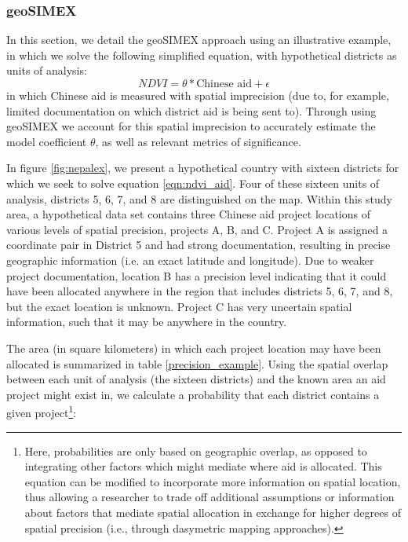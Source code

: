 \subsubsection{geoSIMEX}
In this section, we detail the geoSIMEX approach using an illustrative example, in which we solve the following simplified equation, with hypothetical districts as units of analysis:
\begin{equation}
NDVI = \theta * \text{Chinese aid} + \epsilon
\label{eqn:ndvi_aid}
\end{equation}
in which Chinese aid is measured with spatial imprecision (due to, for example, limited documentation on which district aid is being sent to). 
Through using geoSIMEX we account for this spatial imprecision to accurately estimate the model coefficient $\theta$, as well as relevant metrics of significance. 
\par
In figure \ref{fig:nepalex}, we present a hypothetical country with sixteen districts for which we seek to solve equation \ref{eqn:ndvi_aid}. 
Four of these sixteen units of analysis, districts 5, 6, 7, and 8 are distinguished on the map. 
Within this study area, a hypothetical data set contains three Chinese aid project locations of various levels of spatial precision, projects A, B, and C. 
Project A is assigned a coordinate pair in District 5 and had strong documentation, resulting
in precise geographic information (i.e. an exact latitude and longitude). 
Due to weaker project documentation, location B has a precision level indicating that it could have been allocated anywhere in the region that includes districts 5, 6, 7, and 8, but the exact location is unknown. 
Project C has very uncertain spatial information, such that it may be anywhere in the country. 
\par
The area (in square kilometers) in which each project location may have been allocated is summarized in table \ref{precision_example}.
Using the spatial overlap between each unit of analysis (the sixteen districts) and the known area an aid project might exist in, we calculate a probability that each district contains a given project\footnote{Here, probabilities are only based on geographic overlap, as opposed to integrating other factors which might mediate where aid is allocated. This equation can be modified to incorporate more information on spatial location, thus allowing a researcher to trade off additional assumptions or information about factors that mediate spatial allocation in exchange for higher degrees of spatial precision (i.e., through dasymetric mapping approaches).}:

